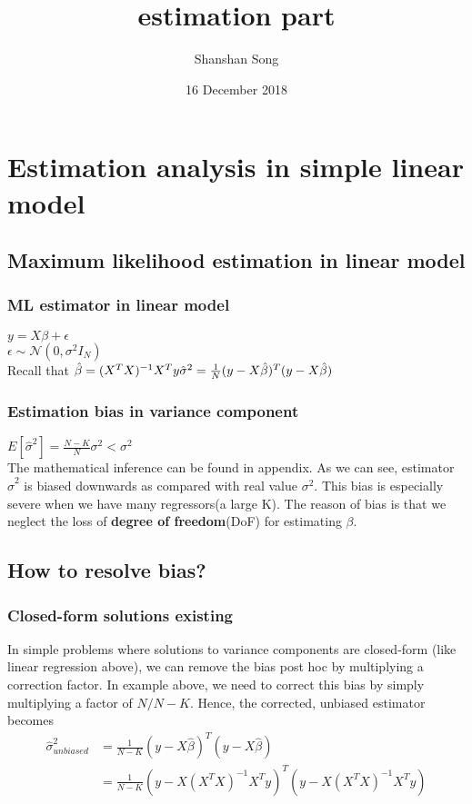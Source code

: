 \documentclass[12pt]{article}
\title{estimation part}
\author{Shanshan Song}
\date{16 December 2018}
\begin{document}
\maketitle

\section{Estimation analysis in simple linear model}
\subsection{Maximum likelihood estimation in linear model}
\subsubsection{ML estimator in linear model}
     $y = X\beta + \epsilon$
     \newcommand\iid{i.i.d.}
     \newcommand\pN{\mathcal{N}}
     \\$\epsilon \sim \pN(0,\sigma^2I_N)$
     \\Recall that $\hat{\beta} = ({X^TX})^{-1}X^Ty 
     \\{\hat{\sigma}}^2 = \frac1N(y-X\hat{\beta})^T(y-X\hat{\beta})$
    
\subsubsection{Estimation bias in variance component}
    $ E[{\hat{\sigma}}^ 2] = \frac{N-K}{N}\sigma^2<\sigma^2$
    \\The mathematical inference can be found in appendix. As we can see, estimator ${\hat{\sigma}}^ 2$ is biased downwards as compared with real value $\sigma^2$. This bias is especially severe when we have many regressors(a large K). The reason of bias is that we neglect the loss of \textbf{degree of freedom}(DoF) for estimating $\beta$.
\subsection{How to resolve bias?}
\subsubsection{Closed-form solutions existing}
    In simple problems where solutions to variance components are closed-form (like linear regression above), we can remove the bias post hoc by multiplying a correction factor. In example above, we need to correct this bias by simply multiplying a factor of $N/N-K$. Hence, the corrected, unbiased estimator becomes
    \begin{equation}
    \begin{aligned}
    {\hat{\sigma}}^2_{unbiased} &= \frac1{N-K}(y-X\hat{\beta})^T(y-X\hat{\beta})\\
    &=\frac1{N-K}(y-X({X^TX})^{-1}X^Ty)^T(y-X({X^TX})^{-1}X^Ty)
    \end{aligned}
    \end{equation}
\end{document}
